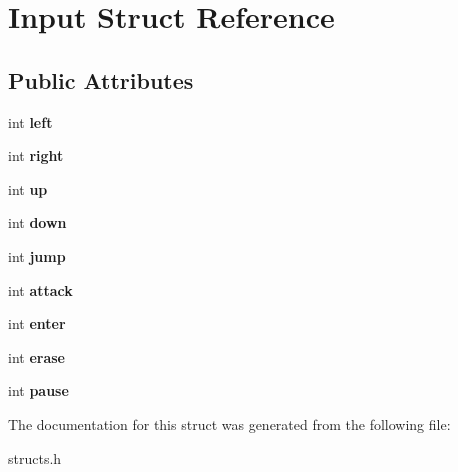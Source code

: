\hypertarget{structInput}{\section{Input Struct Reference}
\label{structInput}
}
\subsection*{Public Attributes}
\begin{DoxyCompactItemize}
\item 
\hypertarget{structInput_aa5becba821fbe9c146c332091ebcc6f2}{int {\bfseries left}}\label{structInput_aa5becba821fbe9c146c332091ebcc6f2}

\item 
\hypertarget{structInput_a481ae9265fafe80dad6850a24980bfb5}{int {\bfseries right}}\label{structInput_a481ae9265fafe80dad6850a24980bfb5}

\item 
\hypertarget{structInput_ad83fb715e39bdc509caf1c2bb7bf692d}{int {\bfseries up}}\label{structInput_ad83fb715e39bdc509caf1c2bb7bf692d}

\item 
\hypertarget{structInput_a24c4a5d08fb4de9300931efb8e7787fb}{int {\bfseries down}}\label{structInput_a24c4a5d08fb4de9300931efb8e7787fb}

\item 
\hypertarget{structInput_a02196046bee72669d3fb90a36000d157}{int {\bfseries jump}}\label{structInput_a02196046bee72669d3fb90a36000d157}

\item 
\hypertarget{structInput_a64f7d1faac36dc0a2e8096b7d3c1e7fc}{int {\bfseries attack}}\label{structInput_a64f7d1faac36dc0a2e8096b7d3c1e7fc}

\item 
\hypertarget{structInput_a9488321c43ebd88cafa3720ac2d964b9}{int {\bfseries enter}}\label{structInput_a9488321c43ebd88cafa3720ac2d964b9}

\item 
\hypertarget{structInput_abc3ed73c809a9f920d730576671b7abd}{int {\bfseries erase}}\label{structInput_abc3ed73c809a9f920d730576671b7abd}

\item 
\hypertarget{structInput_a59c3cea350441855b46a19411e8893b6}{int {\bfseries pause}}\label{structInput_a59c3cea350441855b46a19411e8893b6}

\end{DoxyCompactItemize}


The documentation for this struct was generated from the following file\-:\begin{DoxyCompactItemize}
\item 
structs.\-h\end{DoxyCompactItemize}
